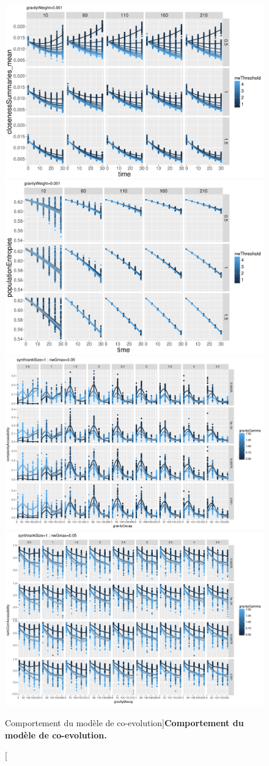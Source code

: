 \begin{figure}[h!]
\includegraphics[width=0.48\linewidth]{Figures/MacroCoEvol/closenessSummaries_mean_gravityWeight0_001}
\includegraphics[width=0.48\linewidth]{Figures/MacroCoEvol/populationEntropies_gravityWeight0_001}\\
\includegraphics[width=0.48\linewidth]{Figures/MacroCoEvol/complexityAccessibility_synthrankSize1_nwGmax0_05}
\includegraphics[width=0.48\linewidth]{Figures/MacroCoEvol/rankCorrAccessibility_synthrankSize1_nwGmax0_05}
\caption[Behavior of the co-evolution model][Comportement du modèle de co-evolution]{}{\textbf{Comportement du modèle de co-evolution.}}
\end{figure}



